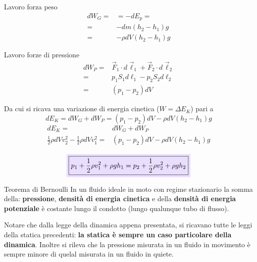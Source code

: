 \documentclass[x11names]{report}
\newcommand{\viola}[1]{\colorbox{yred}{$\displaystyle #1$}}
\begin{document}
	\begin{center}
		\begin{minipage}{0.49\textwidth}
			\begin{es}{Lavoro forza peso}
				\begin{align*}
					dW_{G} =& =-dE_{p} = \\
					=& -dm(h_{2} - h_{1})g\\
					=& -\rho dV(h_{2} - h_{1})g
				\end{align*}
			\end{es}
		\end{minipage}
		\begin{minipage}{0.49\textwidth}
			\begin{es}{Lavoro forze di pressione}
				\begin{align*}
					dW_{P} =& \overrightarrow{F}_{1} \cdot d\vec{\ell}_{1} + \overrightarrow{F}_{2} \cdot d\vec{\ell}_{2} \\
					=& p_{1} S_{1} d\ell_{1} - p_{2} S_{2} d\ell_{2} \\
					=& (p_{1} - p_{2})dV
				\end{align*}
			\end{es}
		\end{minipage}
	\end{center}
	Da cui si ricava una variazione di energia cinetica (\(W = \Delta E_{K}\)) pari a
	\[ 
	dE_{K} = dW_{G} + dW_{P} =  (p_{1} - p_{2})dV-\rho dV(h_{2} - h_{1})g
	\]
	\begin{align*}
		dE_{K} =& dW_{G} + dW_{P} \\
		\frac{1}{2}\rho dVv_{2}^2 - \frac{1}{2}\rho dVv_{1}^2	=& (p_{1} - p_{2})dV-\rho dV(h_{2} - h_{1})g \\
	\end{align*}
	\begin{equation}\label{bernoulli}
		\viola{\boxed{p_{1} + \frac{1}{2}\rho v_{1}^2	+ \rho g h_{1} = p_{2} + \frac{1}{2}\rho v_{2}^2	+ \rho g h_{2}}}
	\end{equation}
	\begin{center}
		\colorbox{yred}{\begin{minipage}{5.75in}
				\begin{redes}{Teorema di Bernoulli}
					In un fluido ideale in moto con regime stazionario la somma della: \textbf{pressione}, \textbf{densità di energia cinetica} e della \textbf{densità di energia potenziale} è costante lungo il condotto (lungo qualunque tubo di flusso).
				\end{redes}
		\end{minipage}}
	\end{center}
	Notare che dalla legge della dinamica appena presentata, si ricavano tutte le leggi della statica precedenti: \textbf{la statica è sempre un caso particolare della dinamica}. Inoltre si rileva che la pressione misurata in un fluido in movimento è sempre minore di quelal misurata in un fluido in quiete.
	
\end{document}
